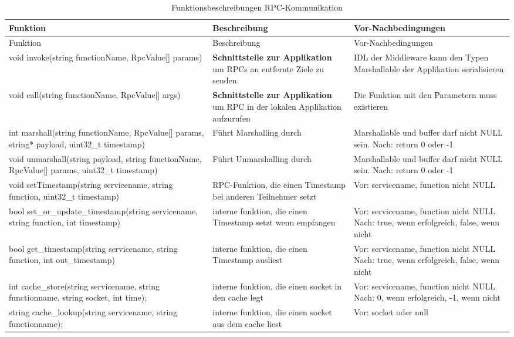 \begin{longtable}{|>{\raggedright\arraybackslash}p{4cm}|>{\raggedright\arraybackslash}p{5cm}|>{\raggedright\arraybackslash}p{5cm}|}
	\caption{Funktionsbeschreibungen RPC-Kommunikation} \label{tab:loesungsstrategie} \\
	\hline
	Funktion & Beschreibung & Vor-Nachbedingungen \\
	\hline
	\endfirsthead
	
	\hline
	Funktion & Beschreibung & Vor-Nachbedingungen \\
	\hline
	\endhead
	
	\hline
	\endfoot
	
	void invoke(string functionName, RpcValue[] params)
	& \textbf{Schnittstelle zur Applikation} um RPCs an entfernte Ziele zu senden. 
	& IDL der Middleware kann den Typen Marshallable der Applikation serialisieren
	\\
	\hline
	void call(string functionName, RpcValue[] args)
	& \textbf{Schnittstelle zur Applikation} um RPC in der lokalen Applikation aufzurufen
	& Die Funktion mit den Parametern muss existieren
	\\
	int marshall(string functionName, RpcValue[] params, string* payload, uint32\_t timestamp)
	& Führt Marshalling durch
	& Marshallable und buffer darf nicht NULL sein. Nach: return 0 oder -1
	\\
	\hline
	void unmarshall(string payload, string functionName, RpcValue[] params, uint32\_t timestamp)
	& Führt Unmarshalling durch
	& Marshallable und buffer darf nicht NULL sein. Nach: return 0 oder -1
	\\
	\hline
	void setTimestamp(string servicename, string function, uint32\_t timestamp)
	& RPC-Funktion, die einen Timestamp bei anderen Teilnehmer setzt
	& Vor: servicename, function nicht NULL 
	\\
	\hline
	bool set\_or\_update\_timestamp(string servicename, string function, int timestamp)
	& interne funktion, die einen Timestamp setzt wenn empfangen
	& Vor: servicename, function nicht NULL Nach: true, wenn erfolgreich, false, wenn nicht
	\\
	\hline
	bool get\_timestamp(string servicename, string function, int out\_timestamp)
	& interne funktion, die einen Timestamp ausliest
	& Vor: servicename, function nicht NULL Nach: true, wenn erfolgreich, false, wenn nicht
	\\
	\hline
	int cache\_store(string servicename, string functionname, string socket, int time);
	& interne funktion, die einen socket in den cache legt
	& Vor: servicename, function nicht NULL Nach: 0, wenn erfolgreich, -1, wenn nicht
	\\
	\hline
	string cache\_lookup(string servicename, string functionname);
	& interne funktion, die einen socket aus dem cache liest
	& Vor: socket oder null
\end{longtable}
 

